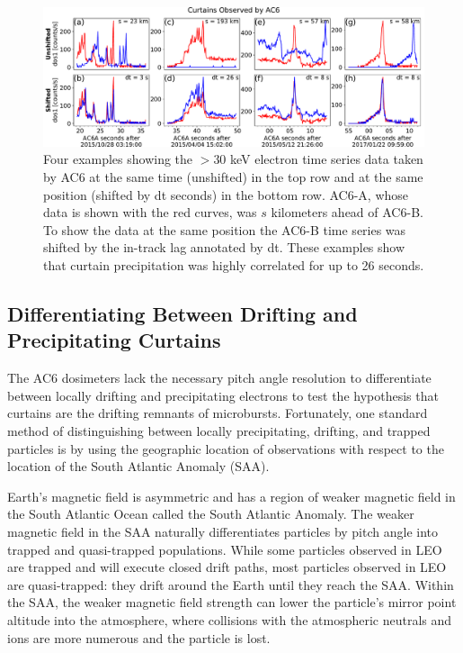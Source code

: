 \documentclass[draft]{agujournal2019}
\begin{document}
\begin{figure}
\includegraphics[width=\textwidth]{fig1.pdf}
\caption{Four examples showing the $>30$ keV electron time series data taken by AC6 at the same time (unshifted) in the top row and at the same position (shifted by dt seconds) in the bottom row. AC6-A, whose data is shown with the red curves, was $s$ kilometers ahead of AC6-B. To show the data at the same position the AC6-B time series was shifted by the in-track lag annotated by dt. These examples show that curtain precipitation was highly correlated for up to 26 seconds.}
\label{fig1}
\end{figure}

\subsection{Differentiating Between Drifting and Precipitating Curtains}

The AC6 dosimeters lack the necessary pitch angle resolution to differentiate between locally drifting and precipitating electrons to test the  hypothesis that curtains are the drifting remnants of microbursts. Fortunately, one standard method of distinguishing between locally precipitating, drifting, and trapped particles is by using the geographic location of observations with respect to the location of the South Atlantic Anomaly (SAA).

Earth's magnetic field is asymmetric and has a region of weaker magnetic field in the South Atlantic Ocean called the South Atlantic Anomaly. The weaker magnetic field in the SAA naturally differentiates particles by pitch angle into trapped and quasi-trapped populations. While some particles observed in LEO are trapped and will execute closed drift paths, most particles observed in LEO are quasi-trapped: they drift around the Earth until they reach the SAA. Within the SAA, the weaker magnetic field strength can lower the particle's mirror point altitude into the atmosphere, where collisions with the atmospheric neutrals and ions are more numerous and the particle is lost. 
\end{document}
